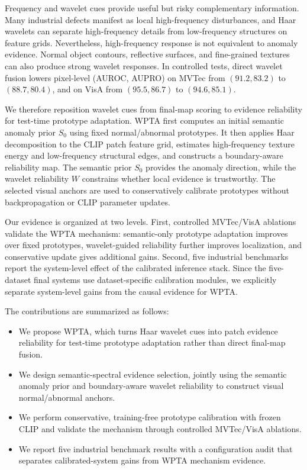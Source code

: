 \documentclass[runningheads]{llncs}
\begin{document}
Frequency and wavelet cues provide useful but risky complementary information. Many industrial defects manifest as local high-frequency disturbances, and Haar wavelets can separate high-frequency details from low-frequency structures on feature grids. Nevertheless, high-frequency response is not equivalent to anomaly evidence. Normal object contours, reflective surfaces, and fine-grained textures can also produce strong wavelet responses. In controlled tests, direct wavelet fusion lowers pixel-level (AUROC, AUPRO) on MVTec from $(91.2,83.2)$ to $(88.7,80.4)$, and on VisA from $(95.5,86.7)$ to $(94.6,85.1)$.

We therefore reposition wavelet cues from final-map scoring to evidence reliability for test-time prototype adaptation. WPTA first computes an initial semantic anomaly prior $S_0$ using fixed normal/abnormal prototypes. It then applies Haar decomposition to the CLIP patch feature grid, estimates high-frequency texture energy and low-frequency structural edges, and constructs a boundary-aware reliability map. The semantic prior $S_0$ provides the anomaly direction, while the wavelet reliability $W$ constrains whether local evidence is trustworthy. The selected visual anchors are used to conservatively calibrate prototypes without backpropagation or CLIP parameter updates.

Our evidence is organized at two levels. First, controlled MVTec/VisA ablations validate the WPTA mechanism: semantic-only prototype adaptation improves over fixed prototypes, wavelet-guided reliability further improves localization, and conservative update gives additional gains. Second, five industrial benchmarks report the system-level effect of the calibrated inference stack. Since the five-dataset final systems use dataset-specific calibration modules, we explicitly separate system-level gains from the causal evidence for WPTA.

The contributions are summarized as follows:
\begin{itemize}
  \item We propose WPTA, which turns Haar wavelet cues into patch evidence reliability for test-time prototype adaptation rather than direct final-map fusion.
  \item We design semantic-spectral evidence selection, jointly using the semantic anomaly prior and boundary-aware wavelet reliability to construct visual normal/abnormal anchors.
  \item We perform conservative, training-free prototype calibration with frozen CLIP and validate the mechanism through controlled MVTec/VisA ablations.
  \item We report five industrial benchmark results with a configuration audit that separates calibrated-system gains from WPTA mechanism evidence.
\end{itemize}
\end{document}
